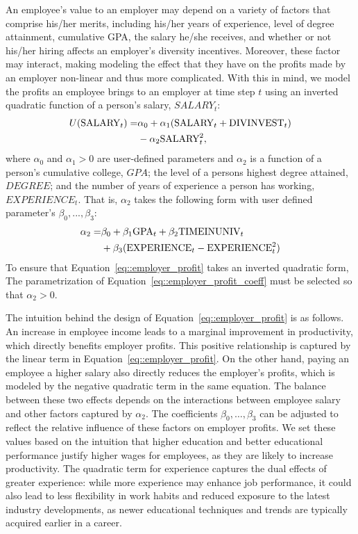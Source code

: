 An employee's value to an employer may depend on a variety of factors that comprise his/her merits, including his/her years of experience, level of degree attainment, cumulative GPA, the salary he/she receives, and whether or not his/her hiring affects an employer's diversity incentives. Moreover, these factor may interact, making modeling the effect that they have on the profits made by an employer non-linear and thus more complicated. With this in mind, we model the profits an employee brings to an employer at time step $t$ using an inverted quadratic function of a person's salary, $SALARY_t$:
\begin{align}
    \label{eq::employer_profit}
    U(\text{SALARY}_t) =&\alpha_0 + \alpha_1 (\text{SALARY}_t+\text{DIVINVEST}_t) \notag\\
    &- \alpha_2 \text{SALARY}_t^2,
\end{align}
where $\alpha_0$ and $\alpha_1>0$ are user-defined parameters and $\alpha_2$ is a function of a person's cumulative college, $GPA$; the level of a persons highest degree attained, $DEGREE$; and the number of years of experience a person has working, $EXPERIENCE_t$. That is,  $\alpha_2$ takes the following form with user defined parameter's $\beta_0,...,\beta_3$:
\begin{align}
    \label{eq::employer_profit_coeff}
    \alpha_2= & \beta_0 + \beta_1 \text{GPA}_t + \beta_2 \text{TIMEINUNIV}_t \notag\\
    &+ \beta_3 (\text{EXPERIENCE}_t-\text{EXPERIENCE}_t^2)
\end{align}
To ensure that Equation~\ref{eq::employer_profit} takes an inverted quadratic form, The parametrization of Equation~\ref{eq::employer_profit_coeff} must be selected so that $\alpha_2>0$.

The intuition behind the design of Equation~\ref{eq::employer_profit} is as follows. An increase in employee income leads to a marginal improvement in productivity, which directly benefits employer profits. This positive relationship is captured by the linear term in Equation~\ref{eq::employer_profit}. On the other hand, paying an employee a higher salary also directly reduces the employer’s profits, which is modeled by the negative quadratic term in the same equation. The balance between these two effects depends on the interactions between employee salary and other factors captured by $\alpha_2$. The coefficients $\beta_0, \dots, \beta_3$ can be adjusted to reflect the relative influence of these factors on employer profits. We set these values based on the intuition that higher education and better educational performance justify higher wages for employees, as they are likely to increase productivity. The quadratic term for experience captures the dual effects of greater experience: while more experience may enhance job performance, it could also lead to less flexibility in work habits and reduced exposure to the latest industry developments, as newer educational techniques and trends are typically acquired earlier in a career.

